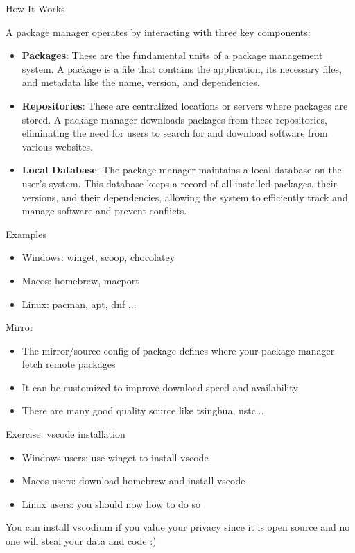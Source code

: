 \begin{frame}[fragile]{How It Works}

	A package manager operates by interacting with three key components:

	\begin{itemize}
		\item \textbf{Packages}: These are the fundamental units of a package management system. A package is a file that contains the application, its necessary files, and metadata like the name, version, and dependencies.
		\item \textbf{Repositories}: These are centralized locations or servers where packages are stored. A package manager downloads packages from these repositories, eliminating the need for users to search for and download software from various websites.
		\item \textbf{Local Database}: The package manager maintains a local database on the user's system. This database keeps a record of all installed packages, their versions, and their dependencies, allowing the system to efficiently track and manage software and prevent conflicts.
	\end{itemize}

\end{frame}


\begin{frame}[fragile]{Examples}
	\begin{itemize}
		\item Windows: winget, scoop, chocolatey
		\item Macos: homebrew, macport
		\item Linux: pacman, apt, dnf ...
	\end{itemize}
\end{frame}

\begin{frame}[fragile]{Mirror}
	\begin{itemize}
		\item The mirror/source config of package defines where your package manager fetch remote packages
		\item It can be customized to improve download speed and availability
		\item There are many good quality source like tsinghua, ustc...
	\end{itemize}
\end{frame}

\begin{frame}[fragile]{Exercise: vscode installation}
	\begin{itemize}
		\item Windows users: use winget to install vscode
		\item Macos users: download homebrew and install vscode
		\item Linux users: you should now how to do so
	\end{itemize}

	You can install vscodium if you value your privacy since it is open source and no one will steal your data and code :)
\end{frame}

